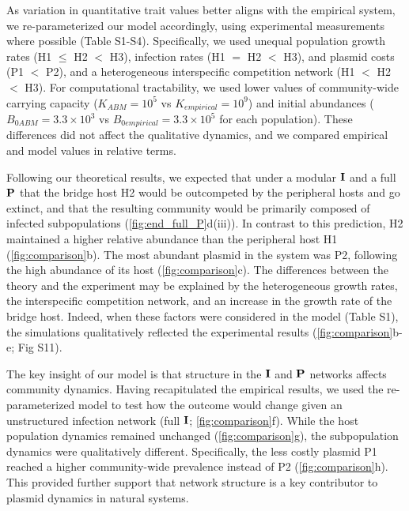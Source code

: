 \documentclass[10pt,letterpaper]{article}
\begin{document}
As variation in quantitative trait values better aligns with the empirical system, we re-parameterized our model accordingly, using experimental measurements where possible (Table S1-S4). Specifically, we used unequal population growth rates (H1 $\leq$ H2 $<$ H3), infection rates (H1 $=$ H2 $<$ H3), and plasmid costs (P1 $<$ P2), and a heterogeneous interspecific competition network (H1 $<$ H2 $<$ H3). For computational tractability, we used lower values of community-wide carrying capacity ($K_{ABM}=10^5$ vs $K_{empirical}=10^9$) and initial abundances ($B_{0ABM}=3.3\times10^3$ vs $B_{0empirical}=3.3\times10^5$ for each population). These differences did not affect the qualitative dynamics, and we compared empirical and model values in relative terms.

Following our theoretical results, we expected that under a modular $\vb{I}$ and a full $\vb{P}$ that the bridge host H2 would be outcompeted by the peripheral hosts and go extinct, and that the resulting community would be primarily composed of infected subpopulations (\cref{fig:end_full_P}d(iii)). In contrast to this prediction, H2 maintained a higher relative abundance than the peripheral host H1 (\cref{fig:comparison}b). The most abundant plasmid in the system was P2, following the high abundance of its host (\cref{fig:comparison}c). The differences between the theory and the experiment may be explained by the heterogeneous growth rates, the interspecific competition network, and an increase in the growth rate of the bridge host. Indeed, when these factors were considered in the model (Table S1), the simulations qualitatively reflected the experimental results (\cref{fig:comparison}b-e; Fig S11).

The key insight of our model is that structure in the $\vb{I}$ and $\vb{P}$ networks affects community dynamics. Having recapitulated the empirical results, we used the re-parameterized model to test how the outcome would change given an unstructured infection network (full $\vb{I}$; \cref{fig:comparison}f). While the host population dynamics remained unchanged (\cref{fig:comparison}g), the subpopulation dynamics were qualitatively different. Specifically, the less costly plasmid P1 reached a higher community-wide prevalence instead of P2 (\cref{fig:comparison}h). This provided further support that network structure is a key contributor to plasmid dynamics in natural systems.
\end{document}
